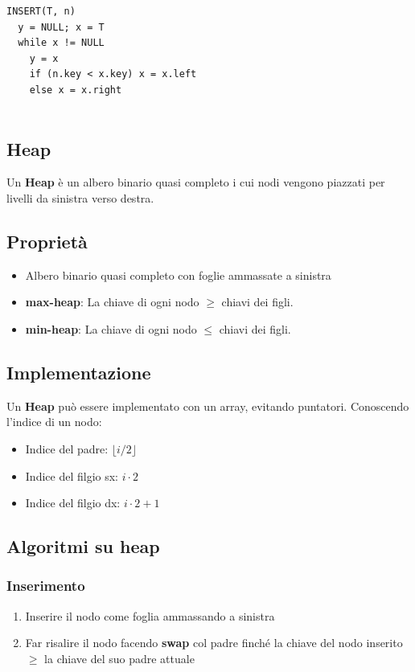 \documentclass{article}
\begin{document}
\begin{lstlisting}
INSERT(T, n)
  y = NULL; x = T
  while x != NULL
    y = x
    if (n.key < x.key) x = x.left
    else x = x.right
    
\end{lstlisting}
\pagebreak

\subsection{Heap}
Un \textbf{Heap} è un albero binario quasi completo i cui nodi vengono piazzati per livelli da sinistra verso destra.
\subsection*{Proprietà}
\begin{itemize}
  \item Albero binario quasi completo con foglie ammassate a sinistra
  \item \textbf{max-heap}: La chiave di ogni nodo \(\geq\) chiavi dei figli.
  \item \textbf{min-heap}: La chiave di ogni nodo \(\leq\) chiavi dei figli.
\end{itemize}
\subsection*{Implementazione}
Un \textbf{Heap} può essere implementato con un array, evitando puntatori. Conoscendo l'indice di un nodo:
\begin{itemize}
  \item Indice del padre: \(\lfloor i / 2 \rfloor\)
  \item Indice del filgio sx: \(i \cdot 2\)
  \item Indice del filgio dx: \(i \cdot 2 + 1\)
\end{itemize}
\pagebreak
\subsection*{Algoritmi su heap}
\subsubsection*{Inserimento}
\begin{enumerate}
  \item Inserire il nodo come foglia ammassando a sinistra
  \item Far risalire il nodo facendo \textbf{swap} col padre finché la chiave del nodo inserito \(\geq\) la chiave del suo padre attuale
\end{enumerate}
\end{document}
